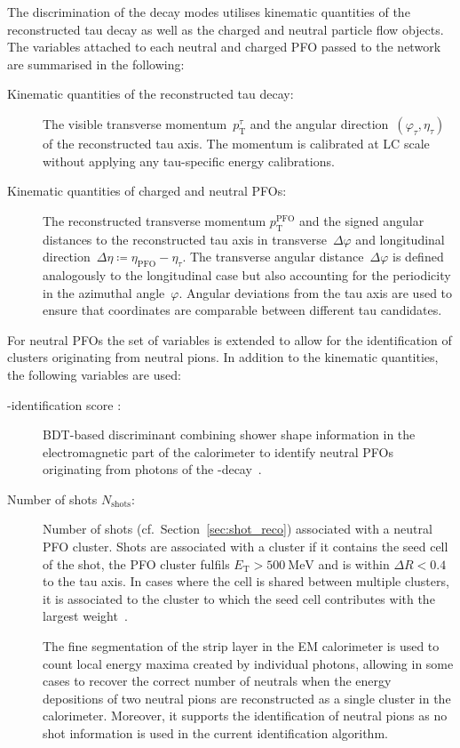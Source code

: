 The discrimination of the decay modes utilises kinematic quantities of the
reconstructed tau decay as well as the charged and neutral particle flow
objects. The variables attached to each neutral and charged PFO passed to the
network are summarised in the following:
\begin{description}
\item[Kinematic quantities of the reconstructed tau decay:] The visible
  transverse momentum~$p_\text{T}^\tau$ and the angular
  direction~$(\varphi_\tau, \eta_\tau)$ of the reconstructed tau axis. The
  momentum is calibrated at LC scale without applying any tau-specific energy
  calibrations.

\item[Kinematic quantities of charged and neutral PFOs:] The reconstructed
  transverse momentum $p_\text{T}^\text{PFO}$ and the signed angular distances
  to the reconstructed tau axis in transverse~$\Delta\varphi$ and longitudinal
  direction~$\Delta\eta \coloneqq \eta_\text{PFO} - \eta_\tau$. The transverse
  angular distance~$\Delta\varphi$ is defined analogously to the longitudinal
  case but also accounting for the periodicity in the azimuthal angle~$\varphi$.
  Angular deviations from the tau axis are used to ensure that coordinates are
  comparable between different tau candidates. 
\end{description}
For neutral PFOs the set of variables is extended to allow for the
identification of clusters originating from neutral pions. In addition to the
kinematic quantities, the following variables are used:
\begin{description}
\item[-identification score :]
  BDT-based discriminant combining shower shape information in the
  electromagnetic part of the calorimeter to identify neutral PFOs originating
  from photons of the -decay~\cite{atlas:taurec:decaymodes}.

\item[Number of shots $N_\text{shots}$:] Number of shots (cf.\
  Section~\ref{sec:shot_reco}) associated with a neutral PFO cluster. Shots are
  associated with a cluster if it contains the seed cell of the shot, the PFO
  cluster fulfils $E_\text{T} > \SI{500}{\mega\electronvolt}$ and is within
  $\Delta R < 0.4$ to the tau axis. In cases where the cell is shared between
  multiple clusters, it is associated to the cluster to which the seed cell
  contributes with the largest weight~\cite{athena}.

  The fine segmentation of the strip layer in the EM calorimeter is used to
  count local energy maxima created by individual photons, allowing in some
  cases to recover the correct number of neutrals when the energy depositions of
  two neutral pions are reconstructed as a single cluster in the calorimeter.
  Moreover, it supports the identification of neutral pions as no shot
  information is used in the current identification algorithm.
\end{description}

